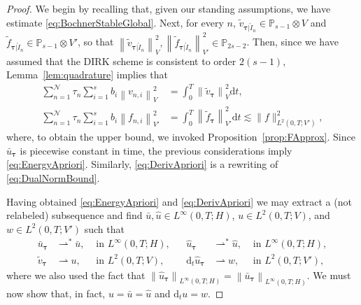 \documentclass{amsart}
\newcommand{\nrm}[1]{\left\| #1 \right\|}
\newcommand{\bftau}{{\boldsymbol{\tau}}}
\newcommand{\msfQ}{\mathsf{Q}}
\newcommand{\mclA}{\mathcal{A}}
\newcommand{\mclQ}{\mathcal{Q}}
\newcommand{\mclN}{\mathcal{N}}
\newcommand{\mbbP}{\mathbb{P}}
\theoremstyle{definition}
\newcommand{\diff}{\mathrm{d}}
\newcommand{\AJS}[1]{#1}
\begin{document}
\begin{proof}
  \AJS{We begin by recalling that, given our standing assumptions, we have estimate \eqref{eq:BochnerStableGlobal}.}
%   
%   
  Next, for every $n$, $\tilde{v}_{\bftau|\mathring{I}_n} \in \mbbP_{s-1} \otimes V$ and $\tilde{f}_{\bftau|\mathring{I}_n} \in \mbbP_{s-1} \otimes V'$, so that $\nrm{\tilde{v}_{\bftau|\mathring{I}_n}}_V^2,\nrm{ \tilde{f}_{\bftau|\mathring{I}_n} }_{V'}^2 \in \mbbP_{2s-2}$. Then, since we have assumed that the DIRK scheme is consistent to order $2(s-1)$, Lemma~\ref{lem:quadrature} implies that
  \begin{align*}
    \sum_{n=1}^{\mclN} \tau_n \sum_{i=1}^s b_i \nrm{ v_{n,i} }_V^2 &= \int_0^T \nrm{ \tilde{v}_\bftau }_V^2 \diff t,
    \\
    \sum_{n=1}^{\mclN} \tau_n \sum_{i=1}^s b_i \nrm{ f_{n,i} }_{V'}^2 &= \int_0^T \nrm{ \tilde{f}_\bftau }_{V'}^2 \diff t \lesssim  \| f \|_{L^2(0,T;V')}^2,
  \end{align*}
  where, to obtain the upper bound, we invoked Proposition~\ref{prop:FApprox}. 
  Since $\bar{u}_\bftau$ is piecewise constant in time, the previous considerations imply \eqref{eq:EnergyApriori}. \AJS{Similarly, \eqref{eq:DerivApriori} is a rewriting of \eqref{eq:DualNormBound}.}

  Having obtained \eqref{eq:EnergyApriori} and \eqref{eq:DerivApriori} we may extract a (not relabeled) subsequence and find $\bar{u},\hat{u} \in L^\infty(0,T;H)$, $u \in L^2(0,T;V)$, and $w \in L^2(0,T;V')$ such that
  \begin{align*}
    \bar{u}_\bftau &\rightharpoonup^* \bar{u}, & \text{ in } L^\infty(0,T;H), &&
    \hat{u}_\bftau &\rightharpoonup^* \hat{u}, & \text{ in } L^\infty(0,T;H), \\
    \tilde{v}_\bftau &\rightharpoonup u, & \text{ in } L^2(0,T;V), &&
    \diff_t\hat{u}_\bftau &\rightharpoonup w, & \text{ in } L^2(0,T;V'),
  \end{align*}
  where we also used the fact that $\nrm{\hat{u}_\bftau }_{L^\infty(0,T;H)} = \nrm{\bar{u}_\bftau }_{L^\infty(0,T;H)}$. We must now show that, in fact, $u = \bar{u} = \hat{u}$ and $\diff_t u = w$.


\end{proof}
\end{document}
